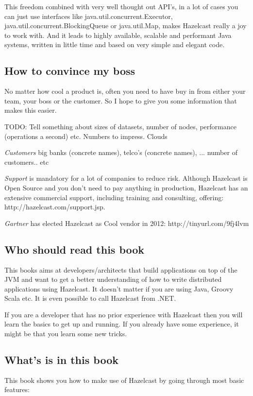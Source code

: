 This freedom combined with very well thought out API's, in a lot of cases you can just use interfaces like java.util.concurrent.Executor, java.util.concurrent.BlockingQueue or java.util.Map, makes Hazelcast really a joy to work with. And it leads to highly available, scalable and performant Java systems, written in little time and based on very simple and elegant code.

\subsection*{How to convince my boss}
No matter how cool a product is, often you need to have buy in from either your team, your boss or the customer. So I hope to give you some information that makes this easier.

TODO: Tell something about sizes of datasets, number of nodes, performance (operations a second) etc. Numbers to impress. Clouds

\emph{Customers} big banks (concrete names), telco's (concrete names), ... number of customers.. etc

\emph{Support} is mandatory for a lot of companies to reduce risk. Although Hazelcast is Open Source and you don't need to pay anything in production, Hazelcast has an extensive commercial support, including training and consulting,  offering: http://hazelcast.com/support.jsp. 

\emph{Gartner} has elected Hazelcast as Cool vendor in 2012: http://tinyurl.com/9fj4lvm

\subsection*{Who should read this book}
This books aims at developers/architects that build applications on top of the JVM and want to get a better understanding of how to write distributed applications using Hazelcast. It doesn't matter if you are using Java, Groovy Scala etc. It is even possible to call Hazelcast from .NET.

If you are a developer that has no prior experience with Hazelcast then you will learn the basics to get up and running. If you already have some experience, it might be that you learn some new tricks.

\subsection*{What's is in this book}

This book shows you how to make use of Hazelcast by going through most basic features:

